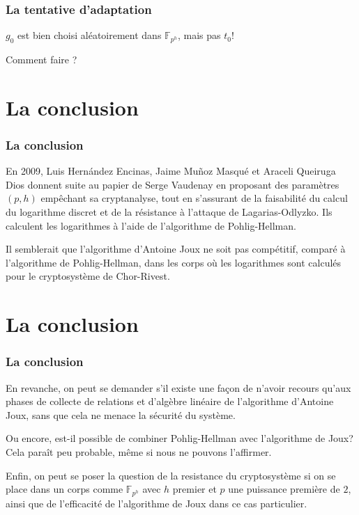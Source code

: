 \documentclass{beamer}
\theoremstyle{definition}
\theoremstyle{remark}
\def\gf #1{\mathbb{F}_{#1}}
\begin{document}
\begin{frame}
  \frametitle{La tentative d'adaptation}
  $g_0$ est bien choisi aléatoirement dans $\gf{p^{h}}$, mais pas $t_0$!

  Comment faire ?
\end{frame}

\section*{La conclusion}
\begin{frame}
  \frametitle{La conclusion}
  En 2009, Luis Hern\'andez Encinas, Jaime Mu\~noz Masqué et Araceli Queiruga Dios donnent suite au papier de Serge Vaudenay en proposant des paramètres $(p,h)$ empêchant sa cryptanalyse, tout en s'assurant de la faisabilité du calcul du logarithme discret et de la résistance à l'attaque de Lagarias-Odlyzko. Ils calculent les logarithmes à l'aide de l'algorithme de Pohlig-Hellman.

  Il semblerait que l'algorithme d'Antoine Joux ne soit pas compétitif, comparé à l'algorithme de Pohlig-Hellman, dans les corps où les logarithmes sont calculés pour le cryptosystème de Chor-Rivest.
\end{frame}

\section*{La conclusion}
\begin{frame}
  \frametitle{La conclusion}
  En revanche, on peut se demander s'il existe une façon de n'avoir recours qu'aux phases de collecte de relations et d'algèbre linéaire de l'algorithme d'Antoine Joux, sans que cela ne menace la sécurité du système.

  Ou encore, est-il possible de combiner Pohlig-Hellman avec l'algorithme de Joux? Cela paraît peu probable, même si nous ne pouvons l'affirmer.
  
  Enfin, on peut se poser la question de la resistance du cryptosystème si on se place dans un corps comme $\gf{p^h}$ avec $h$ premier et $p$ une puissance première de $2$, ainsi que
de l'efficacité de l'algorithme de Joux dans ce cas particulier.
\end{frame}
\end{document}
